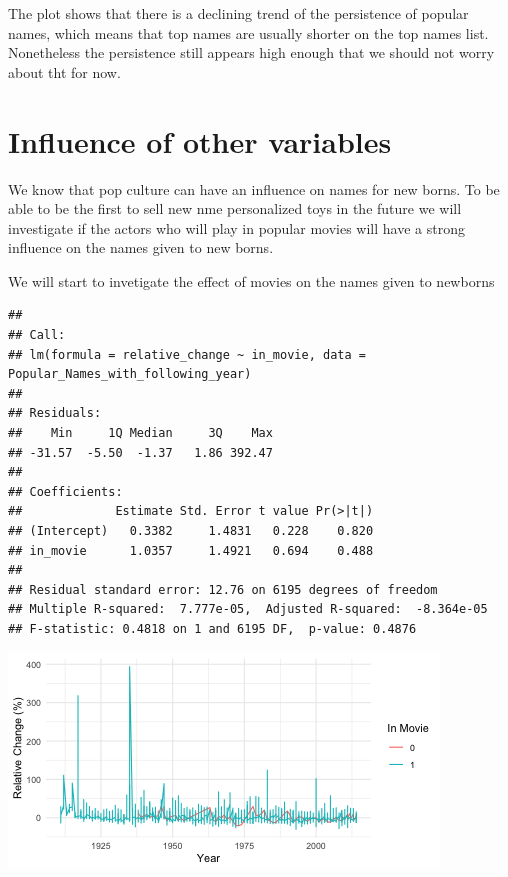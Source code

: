 \documentclass[11pt,preprint, authoryear]{elsarticle}
\let\origfigure\figure
\let\endorigfigure\endfigure
\renewenvironment{figure}[1][2] {
    \expandafter\origfigure\expandafter[H]
} {
    \endorigfigure
}
\numberwithin{equation}{section}
\numberwithin{figure}{section}
\numberwithin{table}{section}
\begin{document}
The plot shows that there is a declining trend of the persistence of
popular names, which means that top names are usually shorter on the top
names list. Nonetheless the persistence still appears high enough that
we should not worry about tht for now.

\hypertarget{influence-of-other-variables}{%
\section{\texorpdfstring{Influence of other variables
\label{Meth}}{Influence of other variables }}\label{influence-of-other-variables}}

We know that pop culture can have an influence on names for new borns.
To be able to be the first to sell new nme personalized toys in the
future we will investigate if the actors who will play in popular movies
will have a strong influence on the names given to new borns.

We will start to invetigate the effect of movies on the names given to
newborns

\begin{verbatim}
## 
## Call:
## lm(formula = relative_change ~ in_movie, data = Popular_Names_with_following_year)
## 
## Residuals:
##    Min     1Q Median     3Q    Max 
## -31.57  -5.50  -1.37   1.86 392.47 
## 
## Coefficients:
##             Estimate Std. Error t value Pr(>|t|)
## (Intercept)   0.3382     1.4831   0.228    0.820
## in_movie      1.0357     1.4921   0.694    0.488
## 
## Residual standard error: 12.76 on 6195 degrees of freedom
## Multiple R-squared:  7.777e-05,  Adjusted R-squared:  -8.364e-05 
## F-statistic: 0.4818 on 1 and 6195 DF,  p-value: 0.4876
\end{verbatim}

\begin{figure}[H]

{\centering \includegraphics{Question1_files/figure-latex/Figure3-1} 

}

\caption{Caption Here \label{Figure3}}\label{fig:Figure3}
\end{figure}

\newpage


\end{document}
